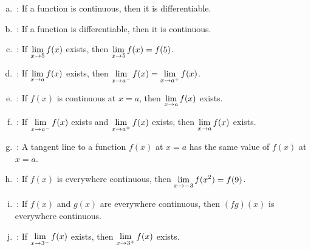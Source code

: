 \documentclass[12pt,letterpaper]{exam}
\begin{document}
\begin{questions}
	\begin{enumerate}[(a)]
	\item {}\,: If a function is continuous, then it is differentiable. \vfill
	\item {}\,: If a function is differentiable, then it is continuous. \vfill
	\item {}\,: If $\displaystyle\lim_{x \to 5} f(x)$ exists, then $\displaystyle\lim_{x \to 5} f(x)= f(5)$. \vfill	
	\item {}\,: If $\displaystyle\lim_{x \to a} f(x)$ exists, then $\displaystyle\lim_{x \to a^-} f(x)= \lim_{x \to a^+} f(x)$. \vfill	
	\item {}\,: If $f(x)$ is continuous at $x= a$, then $\displaystyle\lim_{x \to a} f(x)$ exists. \vfill
	\item {}\,: If $\displaystyle\lim_{x \to a^-} f(x)$ exists and $\displaystyle\lim_{x \to a^+} f(x)$ exists, then $\displaystyle\lim_{x \to a} f(x)$ exists. \vfill
	\item {}\,: A tangent line to a function $f(x)$ at $x= a$ has the same value of $f(x)$ at $x= a$. \vfill	
	\item {}\,: If $f(x)$ is everywhere continuous, then $\displaystyle\lim_{x \to -3} f(x^2)= f(9)$. \vfill
	\item {}\,: If $f(x)$ and $g(x)$ are everywhere continuous, then $(fg)(x)$ is everywhere continuous. \vfill
	\item {}\,: If $\displaystyle\lim_{x \to 3^-} f(x)$ exists, then $\displaystyle\lim_{x \to 3^+} f(x)$ exists. \vfill
	\end{enumerate}


\end{questions}
\end{document}
